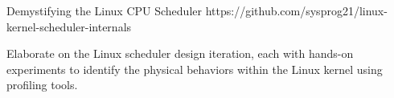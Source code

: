 \begin{cventries}
            \vspace{-3mm}
  
              \cventry
                {} %
                {Demystifying the Linux CPU Scheduler} %
                {} %
                {https://github.com/sysprog21/linux\linebreak-kernel-scheduler-internals} %
                {
                  \vspace{-2mm}
                  \begin{cvitems} %
                    \item {Elaborate on the Linux scheduler design iteration, each with hands-on experiments to identify the physical behaviors within the Linux kernel using profiling tools.}
                  \end{cvitems}
                }

\end{cventries}
